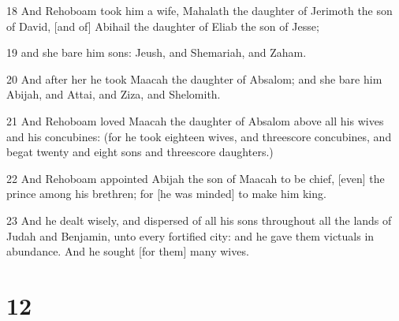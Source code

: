 \par 18 And Rehoboam took him a wife, Mahalath the daughter of Jerimoth the son of David, [and of] Abihail the daughter of Eliab the son of Jesse;
\par 19 and she bare him sons: Jeush, and Shemariah, and Zaham.
\par 20 And after her he took Maacah the daughter of Absalom; and she bare him Abijah, and Attai, and Ziza, and Shelomith.
\par 21 And Rehoboam loved Maacah the daughter of Absalom above all his wives and his concubines: (for he took eighteen wives, and threescore concubines, and begat twenty and eight sons and threescore daughters.)
\par 22 And Rehoboam appointed Abijah the son of Maacah to be chief, [even] the prince among his brethren; for [he was minded] to make him king.
\par 23 And he dealt wisely, and dispersed of all his sons throughout all the lands of Judah and Benjamin, unto every fortified city: and he gave them victuals in abundance. And he sought [for them] many wives.

\chapter{12}

